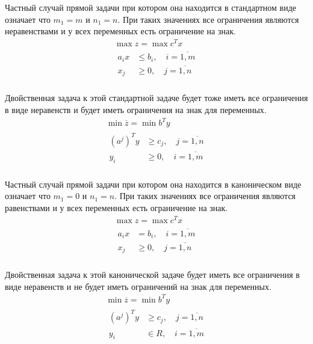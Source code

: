 \documentclass[a4paper,article,14pt]{extarticle}
\begin{document}
Частный случай прямой задачи при котором она находится в стандартном виде означает что \(m_1 = m\) и \(n_1 = n\).
При таких значениях все ограничения являются неравенствами и у всех переменных есть ограничение на знак.
\begin{equation}
    \begin{gathered}
        \max z = \max c^T x \\
        \begin{aligned}
            a_ix & \le b_i, \quad i = \overline{1, m} \\
            x_j & \ge 0, \quad j = \overline{1, n} \\
        \end{aligned}
    \end{gathered}
\end{equation}

Двойственная задача к этой стандартной задаче будет тоже иметь все ограничения в виде неравенств и будет иметь ограничения на знак для переменных.
\begin{equation}
    \begin{gathered}
    \min \overline z = \min b^T y \\
        \begin{aligned}
            (a^j)^Ty & \ge c_j, \quad j = \overline{1, n} \\
            y_i & \ge 0, \quad i = \overline{1, m} \\
        \end{aligned}
    \end{gathered}
\end{equation}

Частный случай прямой задачи при котором она находится в каноническом виде означает что \(m_1 = 0\) и \(n_1 = n\).
При таких значениях все ограничения являются равенствами и у всех переменных есть ограничение на знак.
\begin{equation}
    \begin{gathered}
        \max z = \max c^T x \\
        \begin{aligned}
            a_ix & = b_i, \quad i = \overline{1, m} \\
            x_j & \ge 0, \quad j = \overline{1, n} \\
        \end{aligned}
    \end{gathered}
\end{equation}

Двойственная задача к этой канонической задаче будет иметь все ограничения в виде неравенств и не будет иметь ограничений на знак для переменных.
\begin{equation}
    \begin{gathered}
    \min \overline z = \min b^T y \\
        \begin{aligned}
            (a^j)^Ty & \ge c_j, \quad j = \overline{1, n} \\
            y_i & \in R, \quad i = \overline{1, m} \\
        \end{aligned}
    \end{gathered}
\end{equation}
\end{document}
